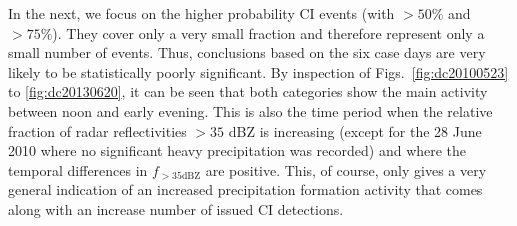 In the next, we focus on the higher probability CI events (with $>50\%$ and $>75\%$). They cover only a very small fraction and therefore represent only a small number of events. Thus, conclusions based on the six case days are very likely to be statistically poorly significant. By inspection 
of Figs.~\ref{fig:dc20100523} to \ref{fig:dc20130620}, it can be seen that both categories show the main activity between noon and early evening. This is also the time period when the relative fraction of radar reflectivities $>35$ dBZ is increasing (except for the 28 June 2010 where no significant heavy precipitation was recorded) and where the temporal differences in $f_{>35\mathrm{dBZ}}$ are positive. This, of course, only gives a very general indication of an increased precipitation formation activity that comes along with an increase number of issued CI detections.


